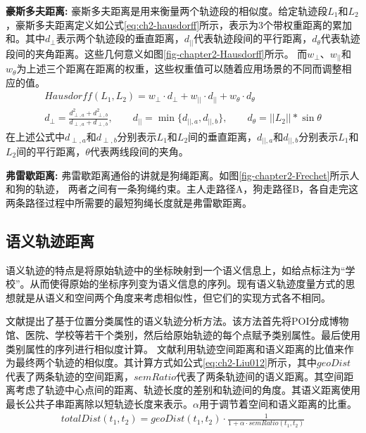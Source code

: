 \textbf{豪斯多夫距离:}
豪斯多夫距离是用来衡量两个轨迹段的相似度。给定轨迹段$L_{1}$和$L_{2}$，豪斯多夫距离定义如公式\ref{eq:ch2-hausdorff}所示，表示为3个带权重距离的累加和。其中$d_{\perp}$表示两个轨迹段的垂直距离，$d_{||}$代表轨迹段间的平行距离，$d_{\theta}$代表轨迹段间的夹角距离。这些几何意义如图\ref{fig-chapter2-Hausdorff}所示。
而$w_{\perp}$、$w_{||}$和$w_{\theta}$为上述三个距离在距离的权重，这些权重值可以随着应用场景的不同而调整相应的值。
\begin{eqnarray}\label{eq:ch2-hausdorff}
Hausdorff(L_{1},L_{2})=w_{\perp} \cdot d_{\perp} + w_{||}\cdot d_{||} +w_{\theta} \cdot d_{\theta} \nonumber \\
d_{\perp} =\frac{d_{\perp,a}^2 + d_{\perp,b} ^2}{d_{\perp,a} +d_{\perp,b}}, \qquad d_{||}=\min\{d_{||,a}, d_{||,b}\},\qquad d_{\theta}=||L_{2}||*\sin{\theta}
\end{eqnarray}
在上述公式中$d_{\perp,a}$和$d_{\perp,b}$分别表示$L_{1}$和$L_{2}$间的垂直距离，$d_{||,a}$和$d_{||,b}$分别表示$L_{1}$和$L_{2}$间的平行距离，$\theta$代表两线段间的夹角。


\textbf{弗雷歇距离:}
弗雷歇距离通俗的讲就是狗绳距离。如图\ref{fig-chapter2-Frechet}所示人和狗的轨迹， 两者之间有一条狗绳约束。主人走路径A，狗走路径B，各自走完这两条路径过程中所需要的最短狗绳长度就是弗雷歇距离。

\subsection{语义轨迹距离}
语义轨迹的特点是将原始轨迹中的坐标映射到一个语义信息上，如给点标注为“学校”。从而使得原始的坐标序列变为语义信息的序列。现有语义轨迹度量方式的思想就是从语义和空间两个角度来考虑相似性，但它们的实现方式各不相同。

文献\cite{Xiao}提出了基于位置分类属性的语义轨迹分析方法。该方法首先将POI分成博物馆、医院、学校等若干个类别，然后给原始轨迹的每个点赋予类别属性。最后使用类别属性的序列进行相似度计算。
文献\cite{Liu012}利用轨迹空间距离和语义距离的比值来作为最终两个轨迹的相似度。其计算方式如公式\ref{eq:ch2-Liu012}所示，其中$geoDist$代表了两条轨迹的空间距离，$semRatio$代表了两条轨迹间的语义距离。其空间距离考虑了轨迹中心点间的距离、轨迹长度的差别和轨迹间的角度。其语义距离使用最长公共子串距离除以短轨迹长度来表示。$\alpha$用于调节着空间和语义距离的比重。
\begin{eqnarray}\label{eq:ch2-Liu012}
totalDist(t_{1},t_{2}) =geoDist(t_{1},t_{2})\cdot \frac{1}{1+\alpha \cdot semRatio(t_{1},t_{2})}
\end{eqnarray}

